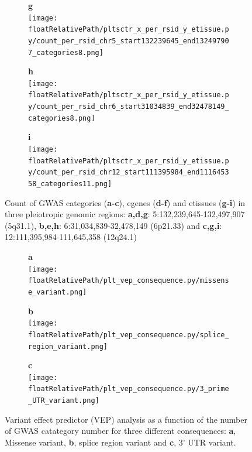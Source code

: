 \begin{figure}[!ht]
\begin{subfigure}[]{.33\textwidth}
\textbf{g}
\\
\texttt{[image: \\floatRelativePath/pltsctr\_x\_per\_rsid\_y\_etissue.py/count\_per\_rsid\_chr5\_start132239645\_end132497907\_categories8.png]}
\end{subfigure}
%
\begin{subfigure}[]{.33\textwidth}
\textbf{h}
\\
\texttt{[image: \\floatRelativePath/pltsctr\_x\_per\_rsid\_y\_etissue.py/count\_per\_rsid\_chr6\_start31034839\_end32478149\_categories8.png]}
\end{subfigure}
%
\begin{subfigure}[]{.33\textwidth}
\textbf{i}
\\
\texttt{[image: \\floatRelativePath/pltsctr\_x\_per\_rsid\_y\_etissue.py/count\_per\_rsid\_chr12\_start111395984\_end111645358\_categories11.png]}
\end{subfigure}

\caption{Count of GWAS categories (\textbf{a-c}), egenes (\textbf{d-f}) and etissues (\textbf{g-i}) in three pleiotropic genomic regions: \textbf{a,d,g}: 5:132,239,645-132,497,907 (5q31.1), \textbf{b,e,h}: 6:31,034,839-32,478,149 (6p21.33) and \textbf{c,g,i}: 12:111,395,984-111,645,358 (12q24.1)} \label{fig:region_gwas_egenes_tissues}
%
\end{figure}

%
%

\begin{figure}[!]
\centering
%
\begin{subfigure}[]{.33\textwidth}
\textbf{a}
\\
\texttt{[image: \\floatRelativePath/plt\_vep\_consequence.py/missense\_variant.png]}
%
\end{subfigure}
%
\begin{subfigure}[]{.33\textwidth}
\textbf{b}
\\
\texttt{[image: \\floatRelativePath/plt\_vep\_consequence.py/splice\_region\_variant.png]}
%
\end{subfigure}
%
\begin{subfigure}[]{.33\textwidth}
\textbf{c}
\\
\texttt{[image: \\floatRelativePath/plt\_vep\_consequence.py/3\_prime\_UTR\_variant.png]}
%
\end{subfigure}
%
\caption{Variant effect predictor (VEP) analysis as a function of the number of GWAS catategory number for three different consequences: \textbf{a}, Missense variant, \textbf{b}, splice region variant and \textbf{c}, 3' UTR variant.} \label{fig:vep_consequence}
%
\end{figure}

